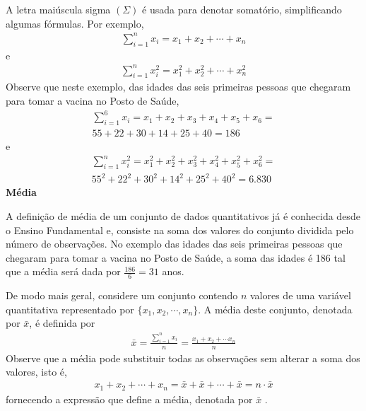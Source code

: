 A letra maiúscula sigma \(\left (\Sigma\right )\) é usada para denotar somatório, simplificando algumas fórmulas. Por exemplo,
\begin{equation*}
\begin{split}\sum^n_{i=1} x_i=x_1+x_2+\cdots +x_n\end{split}
\end{equation*}
e
\begin{equation*}
\begin{split}\sum^n_{i=1} x^2_i=x^2_1+x^2_2+\cdots +x^2_n\end{split}
\end{equation*}
Observe que neste exemplo, das idades das seis primeiras pessoas que chegaram para tomar a vacina no Posto de Saúde,
\begin{equation*}
\begin{split}\sum^6_{i=1}x_i=x_1+x_2+x_3+x_4+x_5+x_6=\\
55 + 22 + 30 + 14 + 25 + 40 = 186\end{split}
\end{equation*}
e
\begin{equation*}
\begin{split}\sum^n_{i=1} x^2_i=x^2_1+x^2_2+x^2_3+x^2_4+x^2_5 +x^2_6=\\
55^2+ 22^2+ 30^2+ 14^2+ 25^2+  40^2=6.830\end{split}
\end{equation*}
\textbf{Média}

A definição de média de um conjunto de dados quantitativos já é conhecida desde o Ensino Fundamental e, consiste na soma dos valores do conjunto dividida pelo número de observações. No exemplo das idades das seis primeiras pessoas que chegaram para tomar a vacina no Posto de Saúde, a soma das idades é 186 tal que a média será dada por \(\frac{186}{6}=31\) anos.

De modo mais geral, considere um conjunto contendo \(n\) valores de uma variável quantitativa representado por \(\{x_1,x_2,\cdots,x_n\}\).
A média deste conjunto, denotada por \(\bar{x}\),  é definida por
\begin{equation*}
\begin{split}\bar{x}=\frac{\sum^n_{i=1}x_i}{n}=\frac{x_1+x_2+\cdots x_n}{n}\end{split}
\end{equation*}
Observe que a média pode substituir todas as observações sem alterar a  soma dos valores, isto é,
\begin{equation*}
\begin{split}x_1+x_2+\cdots+x_n=\bar{x}+\bar{x}+\cdots+\bar{x} = n\cdot \bar{x}\end{split}
\end{equation*}
fornecendo a expressão que define a média, denotada por \(\bar{x}\) .

